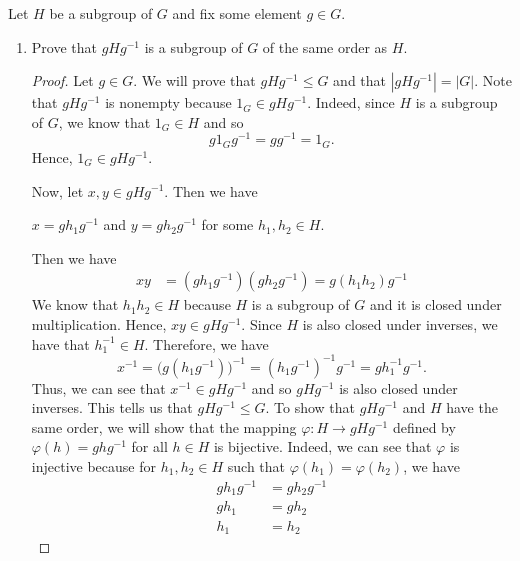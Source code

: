 \documentclass{article}
\begin{document}
\begin{problem}
  Let \( H  \) be a subgroup of \( G  \) and fix some element \( g \in G  \).  
  \begin{enumerate}
      \item[(a)] Prove that \( g H g^{-1}  \) is a subgroup of \( G  \) of the same order as \( H  \).
          \begin{proof}
            Let \( g \in G  \). We will prove that \( g H g^{-1} \leq G  \) and that \( | g H g^{-1} |  = | G |  \). Note that \( g H g^{-1}  \) is nonempty because \( {1}_{G} \in g H g^{-1} \). Indeed, since \( H  \) is a subgroup of \( G  \), we know that \( {1}_{G} \in H  \) and so  
            \[  g {1}_{G} g^{-1} = g g^{-1} = {1}_{G}. \]
            Hence, \( {1}_{G} \in g H g^{-1} \).

            Now, let \( x,y \in g H g^{-1} \). Then we have 
            \begin{center}
                \( x = g {h}_{1} g^{-1} \) and \( y = g {h}_{2} g^{-1} \) for some \( {h}_{1},{h}_{2} \in H  \).
            \end{center}
            Then we have 
            \begin{align*}
                xy &= (g {h}_{1} g^{-1})(g {h}_{2} g^{-1}) 
                   = g ({h}_{1} {h}_{2}) {g}^{-1} 
            \end{align*}
            We know that \( {h}_{1} {h}_{2} \in H   \) because \( H  \) is a subgroup of \( G  \) and it is closed under multiplication. Hence, \( xy \in g H g^{-1} \). Since \( H  \) is also closed under inverses, we have that \( {h}_{1}^{-1} \in H  \). Therefore, we have  
            \[  x^{-1} = \big(g ({h}_{1} g^{-1})\big)^{-1} = ({h}_{1}g^{-1})^{-1} g^{-1} = g {h}_{1}^{-1} g^{-1}.  \]
    Thus, we can see that \( x^{-1} \in g H g^{-1} \) and so \( g H g^{-1}  \) is also closed under inverses. This tells us that \( g H g^{-1} \leq G  \). 
    To show that \( g H g^{-1} \) and \( H  \) have the same order, we will show that the mapping \( \varphi : H \to g H g^{-1} \) defined by \( \varphi(h) = g h g^{-1} \) for all \( h \in H  \) is bijective. Indeed, we can see that \( \varphi  \) is injective because for \( {h}_{1}, {h}_{2} \in H  \) such that \( \varphi({h}_{1}) = \varphi({h}_{2}) \), we have 
    \begin{align*}
        g {h}_{1} g^{-1} &= g {h}_{2} g^{-1} \\
        g {h}_{1} &= g{h}_{2} \\
        {h}_{1} &= {h}_{2} 

\end{align*}
\end{proof}
\end{enumerate}
\end{problem}
\end{document}
